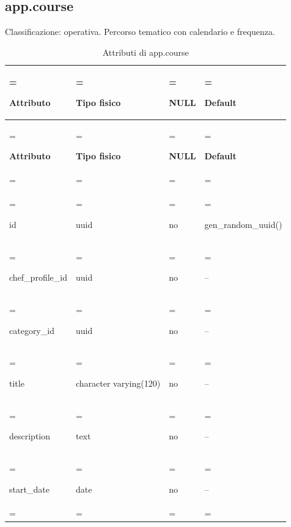 \documentclass[11pt,a4paper]{article}
\begin{document}
\subsection{app.course}

Classificazione: operativa. Percorso tematico con calendario e frequenza.

{\small \renewcommand{\arraystretch}{1.2}

\begin{xltabular}{\linewidth}{>{\hsize\linewidth=\hsize\raggedright\arraybackslash}X>{\hsize\linewidth=\hsize\raggedright\arraybackslash}X>{\hsize\linewidth=\hsize\raggedright\arraybackslash}X>{\hsize\linewidth=\hsize\raggedright\arraybackslash}X}
\caption{Attributi di app.course}\label{tab:dictionary-11}\\
\toprule

\textbf{Attributo} & \textbf{Tipo fisico} & \textbf{NULL} & \textbf{Default}\\\midrule\endfirsthead\toprule\textbf{Attributo} & \textbf{Tipo fisico} & \textbf{NULL} & \textbf{Default}\\\midrule\endhead
\midrule{}\\\endfoot\bottomrule\endlastfoot


{\ttfamily\small id} & {\ttfamily\small uuid} & no & {\ttfamily\small gen\_\allowbreak{}random\_\allowbreak{}uuid(\allowbreak{})}\\\addlinespace[3pt]

{\ttfamily\small chef\_\allowbreak{}profile\_\allowbreak{}id} & {\ttfamily\small uuid} & no & {\ttfamily\small --}\\\addlinespace[3pt]

{\ttfamily\small category\_\allowbreak{}id} & {\ttfamily\small uuid} & no & {\ttfamily\small --}\\\addlinespace[3pt]

{\ttfamily\small title} & {\ttfamily\small character varying(\allowbreak{}120)} & no & {\ttfamily\small --}\\\addlinespace[3pt]

{\ttfamily\small description} & {\ttfamily\small text} & no & {\ttfamily\small --}\\\addlinespace[3pt]

{\ttfamily\small start\_\allowbreak{}date} & {\ttfamily\small date} & no & {\ttfamily\small --}\\\addlinespace[3pt]


\end{xltabular}}
\end{document}
